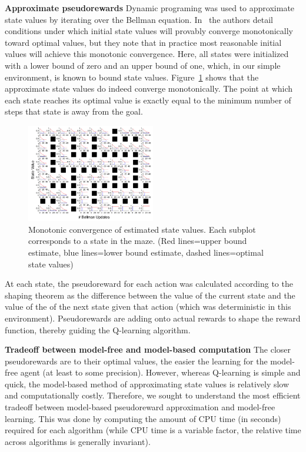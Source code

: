\documentclass[letterpaper]{article}
\begin{document}
\noindent
\textbf{Approximate pseudorewards} Dynamic programing was used to approximate state values by iterating over the Bellman equation. In~\cite{mcmahan2005bounded} the authors detail conditions under which initial state values will provably converge monotonically toward optimal values, but they note that in practice most reasonable initial values will achieve this monotonic convergence. Here, all states were initialized with a lower bound of zero and an upper bound of one, which, in our simple environment, is known to bound state values. Figure~\ref{fig:value_bounds} shows that the approximate state values do indeed converge monotonically. The point at which each state reaches its optimal value is exactly equal to the minimum number of steps that state is away from the goal.

\begin{figure}[ht]
\centering
\includegraphics[width=0.5\textwidth]{value_bounds_labeled}
\caption{Monotonic convergence of estimated state values. Each subplot corresponds to a state in the maze. (Red lines=upper bound estimate, blue lines=lower bound estimate, dashed lines=optimal state values)}
\label{fig:value_bounds}
\end{figure}

At each state, the pseudoreward for each action was calculated according to the shaping theorem as the difference between the value of the current state and the value of the of the next state given that action (which was deterministic in this environment). Pseudorewards are adding onto actual rewards to shape the reward function, thereby guiding the Q-learning algorithm.

\noindent
\textbf{Tradeoff between model-free and model-based computation} The closer pseudorewards are to their optimal values, the easier the learning for the model-free agent (at least to some precision). However, whereas Q-learning is simple and quick, the model-based method of approximating state values is relatively slow and computationally costly. Therefore, we sought to understand the most efficient tradeoff between model-based pseudoreward approximation and model-free learning. This was done by computing the amount of CPU time (in seconds) required for each algorithm (while CPU time is a variable factor, the relative time across algorithms is generally invariant).
\end{document}
